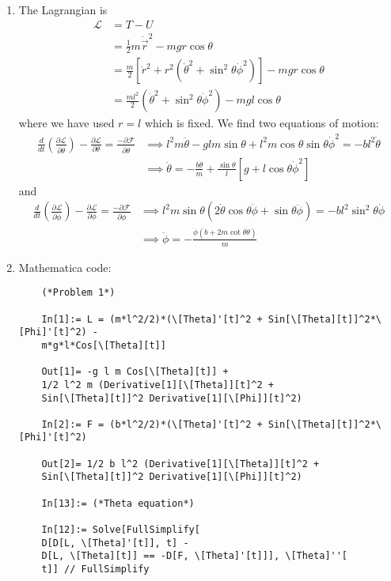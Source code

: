 \documentclass{article}
\theoremstyle{definition}
\newcommand{\p}{\partial}
\newcommand{\lag}{\mathcal{L}}
\newcommand{\f}[2]{\frac{#1}{#2}}
\newcommand{\lp}{\left(}
\newcommand{\rp}{\right)}
\newcommand{\lb}{\left[}
\newcommand{\rb}{\right]}
\begin{document}
\begin{enumerate}[label = (\alph*)]
	\item The Lagrangian is 
	\begin{align*}
	\lag &= T-U\\
	&=  \f{1}{2}m\dot{\vec{r}}^2 - mgr\cos\theta\\
	&= \f{m}{2}\lb \dot{r}^2 + r^2(\dot{\theta}^2+\sin^2\theta\dot{\phi}^2) \rb - mgr\cos\theta \\
	&= \f{ml^2}{2}\lp \dot{\theta}^2 + \sin^2\theta \dot{\phi}^2 \rp - mgl\cos\theta
	\end{align*}
	where we have used $r=l$ which is fixed. We find two equations of motion:
	\begin{align*}
	\f{d}{dt}\lp \f{\p \lag}{\p \dot{\theta}} \rp - \f{\p \lag}{\p \theta} = \f{-\p \mathcal{F}}{\p \dot{\theta}} 
	&\implies l^2 m \ddot{\theta} - glm \sin\theta + l^2 m \cos\theta\sin\theta \dot{\phi}^2 = -bl^2 \dot{\theta}\\
	&\implies  \boxed{\ddot{\theta}  = -\f{b\dot{\theta}}{m}+\f{ \sin\theta }{l} \lb  g + l\cos\theta \dot{\phi}^2 \rb}
	\end{align*}
	and 
	\begin{align*}
	\f{d}{dt}\lp \f{\p \lag}{\p \dot{\phi}} \rp - \f{\p \lag}{\p \phi} = \f{-\p \mathcal{F}}{\p \dot{\phi}} 
	&\implies l^2 m \sin\theta \left(2 \dot\theta \cos\theta \dot\phi+\sin\theta \ddot{\phi}\right) = -bl^2 \sin^2\theta \dot{\phi} \\
	&\implies \boxed{\ddot{\phi} = -\f{\dot{\phi}( b + 2m \cot \theta \dot{\theta})}{m}}
	\end{align*}
	
	
	\item Mathematica code:
	\begin{lstlisting}
	(*Problem 1*)
	
	In[1]:= L = (m*l^2/2)*(\[Theta]'[t]^2 + Sin[\[Theta][t]]^2*\[Phi]'[t]^2) - 
	m*g*l*Cos[\[Theta][t]]
	
	Out[1]= -g l m Cos[\[Theta][t]] + 
	1/2 l^2 m (Derivative[1][\[Theta]][t]^2 + 
	Sin[\[Theta][t]]^2 Derivative[1][\[Phi]][t]^2)
	
	In[2]:= F = (b*l^2/2)*(\[Theta]'[t]^2 + Sin[\[Theta][t]]^2*\[Phi]'[t]^2)
	
	Out[2]= 1/2 b l^2 (Derivative[1][\[Theta]][t]^2 + 
	Sin[\[Theta][t]]^2 Derivative[1][\[Phi]][t]^2)
	
	In[13]:= (*Theta equation*)
	
	In[12]:= Solve[FullSimplify[
	D[D[L, \[Theta]'[t]], t] - 
	D[L, \[Theta][t]] == -D[F, \[Theta]'[t]]], \[Theta]''[
	t]] // FullSimplify
	

\end{lstlisting}
\end{enumerate}
\end{document}
